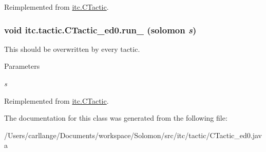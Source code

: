 Reimplemented from \hyperlink{classitc_1_1_c_tactic_a63a5a64ff30293061e37eca71fb77a96}{itc.CTactic}.\hypertarget{classitc_1_1tactic_1_1_c_tactic__ed0_aa8db38d3d879327bb337138a8f42a069}{
\subsubsection[{run\_\-}]{\setlength{\rightskip}{0pt plus 5cm}void itc.tactic.CTactic\_\-ed0.run\_\- ({\bf solomon} {\em s})}}
\label{classitc_1_1tactic_1_1_c_tactic__ed0_aa8db38d3d879327bb337138a8f42a069}
This should be overwritten by every tactic. 
\begin{DoxyParams}{Parameters}
\item[{\em s}]\end{DoxyParams}


Reimplemented from \hyperlink{classitc_1_1_c_tactic_ae5f5c51a6e04d22bc298dbdec4080770}{itc.CTactic}.

The documentation for this class was generated from the following file:\begin{DoxyCompactItemize}
\item 
/Users/carllange/Documents/workspace/Solomon/src/itc/tactic/CTactic\_\-ed0.java\end{DoxyCompactItemize}
